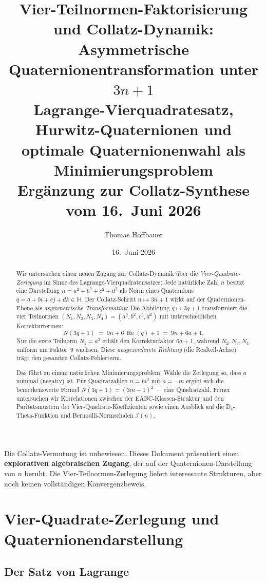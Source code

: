 \documentclass[12pt,a4paper]{article}
\title{%
  Vier-Teilnormen-Faktorisierung und Collatz-Dynamik:\\[0.3em]
  Asymmetrische Quaternionentransformation unter $3n+1$\\[0.5em]
  \large Lagrange-Vierquadratesatz, Hurwitz-Quaternionen und\\
  optimale Quaternionenwahl als Minimierungsproblem\\[0.3em]
  \large Ergänzung zur Collatz-Synthese vom 16.\ Juni 2026%
}
\author{Thomas Hoffbauer}
\date{16.\ Juni 2026}
\newcommand{\HH}{\mathbb{H}}
\newcommand{\In}{\mathcal{I}}
\newcommand{\Nq}{N}          %
\newcommand{\Re}{\operatorname{Re}}
\begin{document}
\maketitle

\begin{abstract}
Wir untersuchen einen neuen Zugang zur Collatz-Dynamik über die
\emph{Vier-Quadrate-Zerlegung} im Sinne des Lagrange-Vierquadratensatzes:
Jede natürliche Zahl $n$ besitzt eine Darstellung $n = a^2+b^2+c^2+d^2$
als Norm eines Quaternions $q = a+bi+cj+dk \in \HH$.
Der Collatz-Schritt $n \mapsto 3n+1$ wirkt auf der Quaternionen-Ebene
als \emph{asymmetrische Transformation}: Die Abbildung $q \mapsto 3q+1$
transformiert die vier Teilnormen $(N_1,N_2,N_3,N_4) = (a^2,b^2,c^2,d^2)$
mit unterschiedlichen Korrekturtermen:
\[
  \Nq(3q+1) \;=\; 9n + 6\,\Re(q) + 1 \;=\; 9n + 6a + 1.
\]
Nur die erste Teilnorm $N_1 = a^2$ erhält den Korrekturfaktor $6a+1$,
während $N_2, N_3, N_4$ uniform um Faktor~$9$ wachsen. Diese \emph{ausgezeichnete
Richtung} (die Realteil-Achse) trägt den gesamten Collatz-Fehlerterm.

Das führt zu einem natürlichen Minimierungsproblem: Wähle die Zerlegung so,
dass $a$ minimal (negativ) ist. Für Quadratzahlen $n = m^2$ mit $a = -m$
ergibt sich die bemerkenswerte Formel $\Nq(3q+1) = (3m-1)^2$ --- eine
Quadratzahl. Ferner untersuchen wir Korrelationen zwischen der EABC-Klassen-Struktur
und den Paritätsmustern der Vier-Quadrate-Koeffizienten sowie einen Ausblick
auf die D${}_4$-Theta-Funktion und Bernoulli-Normschalen $\In(n)$.
\end{abstract}

\tableofcontents

\bigskip
\begin{tcolorbox}[warnung, title={Einordnung}]
Die Collatz-Vermutung ist unbewiesen. Dieses Dokument präsentiert einen
\textbf{explorativen algebraischen Zugang}, der auf der Quaternionen-Darstellung
von $n$ beruht. Die Vier-Teilnormen-Zerlegung liefert interessante Strukturen,
aber noch keinen vollständigen Konvergenzbeweis.
\end{tcolorbox}

\section{Vier-Quadrate-Zerlegung und Quaternionendarstellung}
\label{sec:zerlegung}

\subsection{Der Satz von Lagrange}
\end{document}
